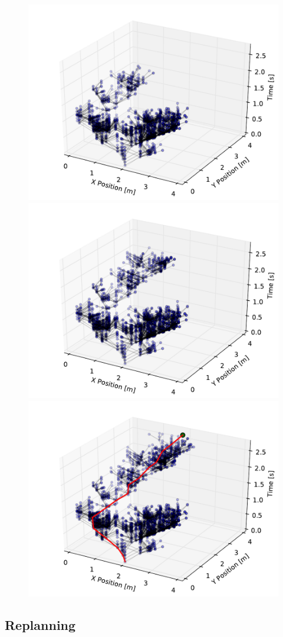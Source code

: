 \begin{figure}[h!]
    \includegraphics[width=0.32\linewidth]{figs/tree_6}
    \includegraphics[width=0.32\linewidth]{figs/tree_7}
    \includegraphics[width=0.32\linewidth]{figs/tree_8}
    \caption{}
    \label{fig:tree}
\end{figure}


\subsection{Replanning}

